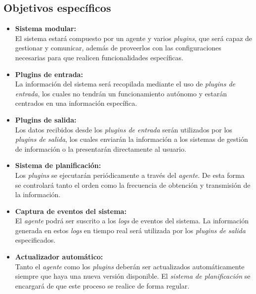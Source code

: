     \subsection{Objetivos específicos}
        \begin{itemize}
            \item \textbf{Sistema modular:} \\
                El sistema estará compuesto por un agente y varios \textit{plugins}, que será capaz de gestionar y comunicar, además de proveerlos con las configuraciones necesarias para que realicen funcionalidades específicas.
                
            \item \textbf{Plugins de entrada:} \\
                La información del sistema será recopilada mediante el uso de \textit{plugins de entrada}, los cuales no tendrán un funcionamiento autónomo y estarán centrados en una información específica.
                
            \item \textbf{Plugins de salida:} \\
                Los datos recibidos desde los \textit{plugins de entrada} serán utilizados por los \textit{plugins de salida}, los cuales enviarán la información a los sistemas de gestión de información o la presentarán directamente al usuario.
                
            \item \textbf{Sistema de planificación:} \\
                Los \textit{plugins} se ejecutarán periódicamente a través del \textit{agente}. De esta forma se controlará tanto el orden como la frecuencia de obtención y transmisión de la información.
                  
            \item \textbf{Captura de eventos del sistema:} \\
                El \textit{agente} podrá ser suscrito a los \textit{logs} de eventos del sistema. La información generada en estos \textit{logs} en tiempo real será utilizada por los \textit{plugins de salida} especificados.
            
            \item \textbf{Actualizador automático:} \\
                Tanto el \textit{agente} como los \textit{plugins} deberán ser actualizados automáticamente siempre que haya una nueva versión disponible. El \textit{sistema de planificación} se encargará de que este proceso se realice de forma regular.
                

\end{itemize}
